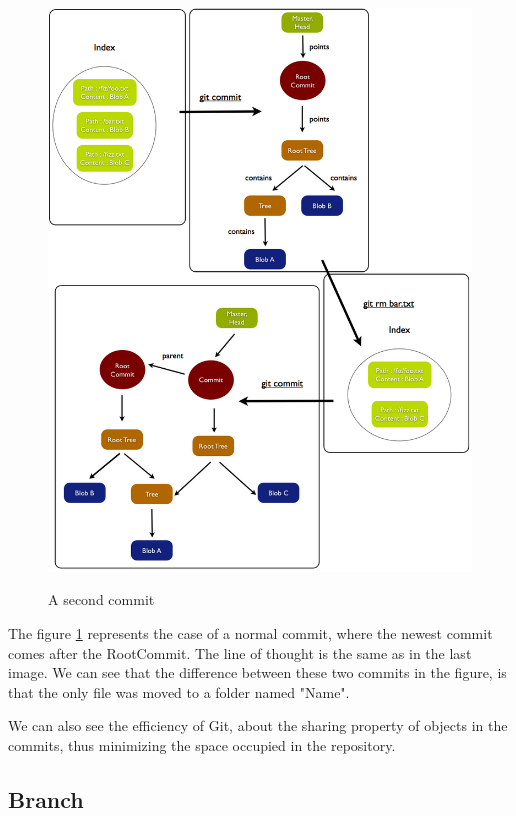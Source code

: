 \begin{figure}[h] 
	\caption{A second commit}
	\centering
	\includegraphics[scale=0.4]{images/commit2.png}
	\label{fig:commit2}
\end{figure}

The figure \ref{fig:commit2} represents the case of a normal commit, where the
newest commit comes after the RootCommit. The line of thought is the same as in
the last image. We can see that the difference between these two commits in the
figure, is that the only file was moved to a folder named "Name". \par
We can also see the efficiency of Git, about the sharing property of objects in
the commits, thus minimizing the space occupied in the repository. \par
\subsection{Branch}

